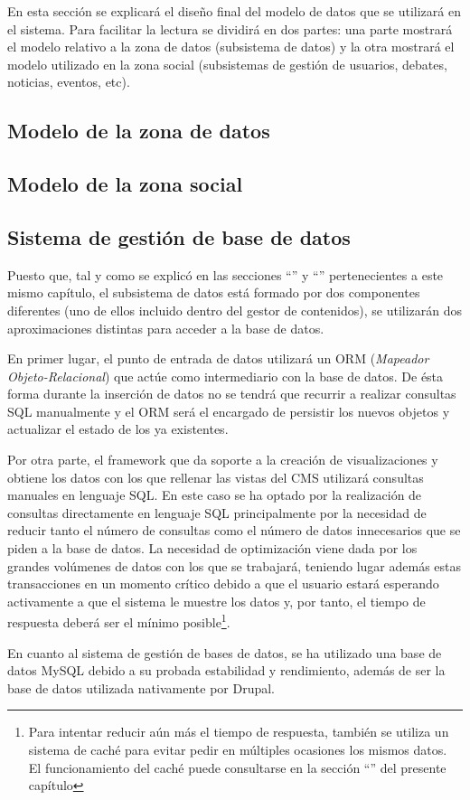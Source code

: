 En esta sección se explicará el diseño final del modelo de datos que se utilizará en el sistema.  Para facilitar la lectura se dividirá en dos partes: una parte mostrará el modelo relativo a la zona de datos (subsistema de datos) y la otra mostrará el modelo utilizado en la zona social (subsistemas de gestión de usuarios, debates, noticias, eventos, etc).


\subsection{Modelo de la zona de datos}
\label{modelo_datos_zona_datos}



\subsection{Modelo de la zona social}
\label{modelo_datos_zona_social}



\subsection{Sistema de gestión de base de datos}
Puesto que, tal y como se explicó en las secciones ``'' y ``'' pertenecientes a este mismo capítulo, el subsistema de datos está formado por dos componentes diferentes (uno de ellos incluido dentro del gestor de contenidos), se utilizarán dos aproximaciones distintas para acceder a la base de datos.

En primer lugar, el punto de entrada de datos utilizará un ORM (\textit{Mapeador Objeto-Relacional}) que actúe como intermediario con la base de datos.  De ésta forma  durante la inserción de datos no se tendrá que recurrir a realizar consultas SQL manualmente y el ORM será el encargado de persistir los nuevos objetos y actualizar el estado de los ya existentes.

Por otra parte, el framework que da soporte a la creación de visualizaciones y obtiene los datos con los que rellenar las vistas del CMS utilizará consultas manuales en lenguaje SQL.  En este caso se ha optado por la realización de consultas directamente en lenguaje SQL principalmente por la necesidad de reducir tanto el número de consultas como el número de datos innecesarios que se piden a la base de datos.  La necesidad de optimización viene dada por los grandes volúmenes de datos con los que se trabajará, teniendo lugar además estas transacciones en un momento crítico debido a que el usuario estará esperando activamente a que el sistema le muestre los datos y, por tanto, el tiempo de respuesta deberá ser el mínimo posible\footnote{Para intentar reducir aún más el tiempo de respuesta, también se utiliza un sistema de caché para evitar pedir en múltiples ocasiones los mismos datos.  El funcionamiento del caché puede consultarse en la sección ``'' del presente capítulo}.

En cuanto al sistema de gestión de bases de datos, se ha utilizado una base de datos MySQL debido a su probada estabilidad y rendimiento, además de ser la base de datos utilizada nativamente por Drupal.
